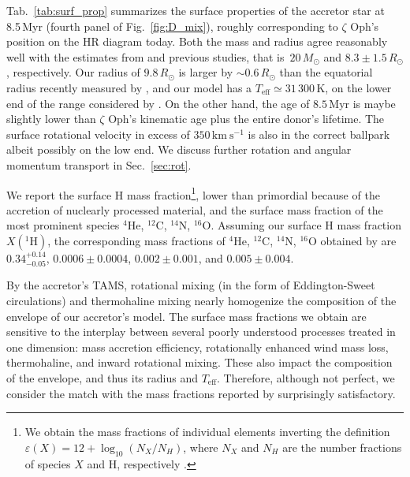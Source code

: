 \documentclass[twocolumn,twocolappendix,trackchanges]{aastex63}
\newcommand{\kms}{{\mathrm{km\ s^{-1}}}}
\DeclareRobustCommand{\Figref}[1]{Fig.~\ref{#1}}
\DeclareRobustCommand{\Tabref}[1]{Tab.~\ref{#1}}
\DeclareRobustCommand{\Secref}[1]{Sec.~\ref{#1}}
\newcommand{\zoph}{$\zeta$ Oph}
\begin{document}
\Tabref{tab:surf_prop} summarizes the surface properties of the
accretor star at 8.5\,Myr (fourth panel of
\Figref{fig:D_mix}), roughly corresponding to \zoph's position on the
HR diagram today. Both the
mass and radius agree reasonably well with the estimates from
 and previous studies, that is~$20\,M_\odot$
and $8.3\pm1.5\,R_\odot$, respectively. Our radius of $9.8\,R_\odot$
is larger by $\sim0.6\,R_\odot$ than the equatorial radius recently
measured by \cite{gordon:18}, and our model has a
$T_\mathrm{eff}\simeq31\,300$\,K, on the lower end of the range considered by
. On the other hand, the age of
$8.5$\,Myr is maybe slightly lower than \zoph's
kinematic age plus the entire donor's lifetime. The surface rotational velocity in excess
of $350\,\kms$ is also in the correct ballpark albeit possibly on the
low end. We discuss further rotation and angular momentum transport in
\Secref{sec:rot}.

We report the surface H mass fraction\footnote{We obtain the mass
  fractions of individual elements inverting the definition
  $\varepsilon(X)=12+\log_{10}(N_X/N_H)$, where $N_X$ and $N_H$ are
  the number fractions of species $X$ and H, respectively
  \citep[e.g.,][]{lodders:19}.}, lower than primordial because of the
accretion of nuclearly processed material, and the surface mass
fraction of the most prominent species $^4\mathrm{He}$,
$^{12}\mathrm{C}$, $^{14}\mathrm{N}$, $^{16}\mathrm{O}$.  Assuming our
surface H mass fraction $X(^1\mathrm{H})$, the corresponding mass
fractions of $^4\mathrm{He}$, $^{12}\mathrm{C}$, $^{14}\mathrm{N}$,
$^{16}\mathrm{O}$ obtained by  are
$0.34^{+0.14}_{-0.05}$, $0.0006\pm0.0004$, $0.002\pm0.001$, and
$0.005\pm0.004$.

By the accretor's TAMS, rotational mixing (in the
form of Eddington-Sweet circulations) and thermohaline mixing nearly
homogenize the composition of the envelope of our accretor's
model. The surface mass fractions we obtain are sensitive to the
interplay between several poorly understood processes treated in one
dimension: mass accretion efficiency, rotationally enhanced wind mass
loss, thermohaline, and inward rotational mixing. These also impact
the composition of the envelope, and thus its radius and
$T_\mathrm{eff}$. Therefore, although not perfect, we consider the
match with the mass fractions reported by 
surprisingly satisfactory.
\end{document}
